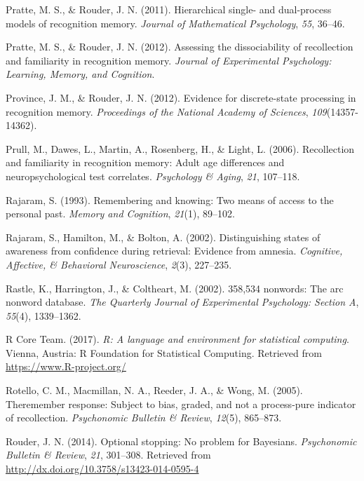 \documentclass[english,,man,floatsintext]{apa6}
\begin{document}
\leavevmode\hypertarget{ref-Pratte:Rouder:2011}{}%
Pratte, M. S., \& Rouder, J. N. (2011). Hierarchical single- and dual-process models of recognition memory. \emph{Journal of Mathematical Psychology}, \emph{55}, 36--46.

\leavevmode\hypertarget{ref-Pratte:Rouder:2012}{}%
Pratte, M. S., \& Rouder, J. N. (2012). Assessing the dissociability of recollection and familiarity in recognition memory. \emph{Journal of Experimental Psychology: Learning, Memory, and Cognition}.

\leavevmode\hypertarget{ref-Province:Rouder:2012}{}%
Province, J. M., \& Rouder, J. N. (2012). Evidence for discrete-state processing in recognition memory. \emph{Proceedings of the National Academy of Sciences}, \emph{109}(14357-14362).

\leavevmode\hypertarget{ref-Prull:etal:2006}{}%
Prull, M., Dawes, L., Martin, A., Rosenberg, H., \& Light, L. (2006). Recollection and familiarity in recognition memory: Adult age differences and neuropsychological test correlates. \emph{Psychology \& Aging}, \emph{21}, 107--118.

\leavevmode\hypertarget{ref-Rajaram:1993}{}%
Rajaram, S. (1993). Remembering and knowing: Two means of access to the personal past. \emph{Memory and Cognition}, \emph{21}(1), 89--102.

\leavevmode\hypertarget{ref-Rajaram:etal:2002}{}%
Rajaram, S., Hamilton, M., \& Bolton, A. (2002). Distinguishing states of awareness from confidence during retrieval: Evidence from amnesia. \emph{Cognitive, Affective, \& Behavioral Neuroscience}, \emph{2}(3), 227--235.

\leavevmode\hypertarget{ref-Rastle:etal:2002}{}%
Rastle, K., Harrington, J., \& Coltheart, M. (2002). 358,534 nonwords: The arc nonword database. \emph{The Quarterly Journal of Experimental Psychology: Section A}, \emph{55}(4), 1339--1362.

\leavevmode\hypertarget{ref-R-base}{}%
R Core Team. (2017). \emph{R: A language and environment for statistical computing}. Vienna, Austria: R Foundation for Statistical Computing. Retrieved from \url{https://www.R-project.org/}

\leavevmode\hypertarget{ref-Rotello:etal:2005}{}%
Rotello, C. M., Macmillan, N. A., Reeder, J. A., \& Wong, M. (2005). Theremember response: Subject to bias, graded, and not a process-pure indicator of recollection. \emph{Psychonomic Bulletin \& Review}, \emph{12}(5), 865--873.

\leavevmode\hypertarget{ref-Rouder:2014}{}%
Rouder, J. N. (2014). Optional stopping: No problem for Bayesians. \emph{Psychonomic Bulletin \& Review}, \emph{21}, 301--308. Retrieved from \url{http://dx.doi.org/10.3758/s13423-014-0595-4}
\end{document}
